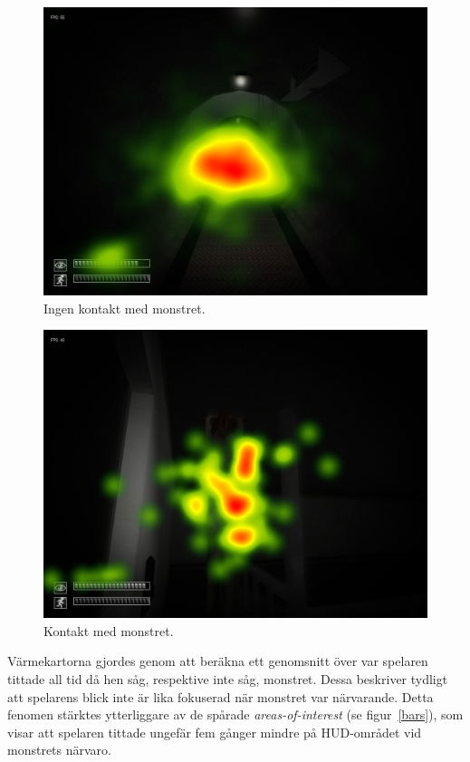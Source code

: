 \documentclass{article}
\begin{document}
\begin{figure}[h!]
    \begin{center}
        \includegraphics*[width=0.63\columnwidth]{experiment/NoContact_Heatmap.png}
        \caption{Ingen kontakt med monstret.}
        \label{no_contact}
    \end{center}
\end{figure}

\begin{figure}[h!]
    \begin{center}
        \includegraphics*[width=0.63\columnwidth]{experiment/Contact_Heatmap.png}
        \caption{Kontakt med monstret.}
        \label{contact}
    \end{center}
\end{figure}

\newpage

Värmekartorna gjordes genom att beräkna ett genomsnitt över var spelaren tittade all tid då hen såg, respektive inte såg, monstret. Dessa beskriver tydligt att spelarens blick inte är lika fokuserad när monstret var närvarande. Detta fenomen stärktes ytterliggare av de spårade \textit{areas-of-interest} (se figur~\ref{bars}), som visar att spelaren tittade ungefär fem gånger mindre på HUD-området vid monstrets närvaro.
\end{document}
